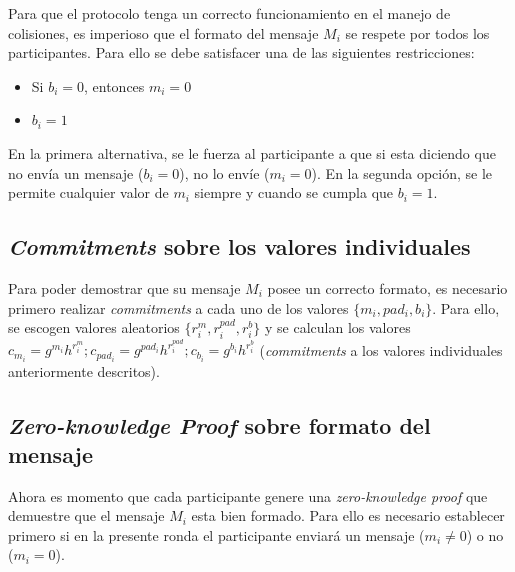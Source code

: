 Para que el protocolo tenga un correcto funcionamiento en el manejo de colisiones, 
es imperioso que el formato del mensaje $M_i$ se respete por todos los participantes. 
Para ello se debe satisfacer una de las siguientes restricciones:
\begin{itemize}
    \item Si $b_i = 0$, entonces $m_i = 0$
    \item $b_i = 1$
\end{itemize}
En la primera alternativa, se le fuerza al participante a que si esta diciendo que 
no envía un mensaje ($b_i = 0$), no lo envíe ($m_i = 0$). En la segunda opción, se 
le permite cualquier valor de $m_i$ siempre y cuando se cumpla que $b_i = 1$.

\subsection{\emph{Commitments} sobre los valores individuales}

Para poder demostrar que su mensaje $M_i$ posee un correcto formato, es necesario 
primero realizar \emph{commitments} a cada uno de los valores $\{m_i, pad_i, b_i\}$. 
Para ello, se escogen valores aleatorios $\{r_i^m, r_i^{pad}, r_i^b\}$ y se calculan 
los valores $c_{m_i} = g^{m_i} h^{r_i^m}; c_{pad_i} = g^{pad_i} h^{r_i^{pad}}; c_{b_i} = g^{b_i} h^{r_i^b}$ 
(\emph{commitments} a los valores individuales anteriormente descritos).

\subsection{\emph{Zero-knowledge Proof} sobre formato del mensaje}

Ahora es momento que cada participante genere una \emph{zero-knowledge proof} que 
demuestre que el mensaje $M_i$ esta bien formado. Para ello es necesario establecer 
primero si en la presente ronda el participante enviará un mensaje ($m_i \neq 0$) o 
no ($m_i = 0$).

